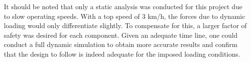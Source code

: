 It should be noted that only a static analysis was conducted for this project due to slow operating speeds. With a top speed of 3 km/h, the forces due to dynamic loading would only differentiate slightly. To compensate for this, a larger factor of safety was desired for each component. Given an adequate time line, one could conduct a full dynamic simulation to obtain more accurate results and confirm that the design to follow is indeed adequate for the imposed loading conditions. 







